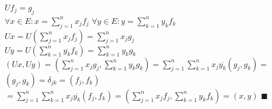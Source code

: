 \documentclass[a4paper, 14pt]{extarticle}
\def\huge{\displaystyle}
\def\bigline{\vspace{5mm}\\}
\def\qed{$\blacksquare$}
\begin{document}
$Uf_j = g_j$\\
$\forall x \in E: x = \huge \sum_{j=1}^n x_j f_j$
\hspace{1cm}
$\forall y \in E: y = \huge \sum_{k=1}^n y_k f_k$\\
$Ux = \huge U\left(\sum_{j=1}^n x_j f_j \right) = \sum_{j=1}^n x_j g_j$\\
$Uy = \huge U\left(\sum_{k=1}^n y_k f_k \right) = \sum_{k=1}^n y_k g_k$\\
$\huge (Ux, Uy) = \left(\sum_{j=1}^n x_j g_j, \sum_{k=1}^n y_k g_k \right) = \sum_{j=1}^n \sum_{k=1}^n x_j \overline{y_k} (g_j,g_k) =$\\
$(g_j,g_k) = \delta_{jk} = (f_j,f_k)$\\
$= \huge \sum_{j=1}^n \sum_{k=1}^n x_j \overline{y_k} (f_j,f_k) = \left(\sum_{j=1}^n x_jf_j, \sum_{k=1}^n y_k f_k \right) = (x,y)$ \qed
\bigline
\end{document}
